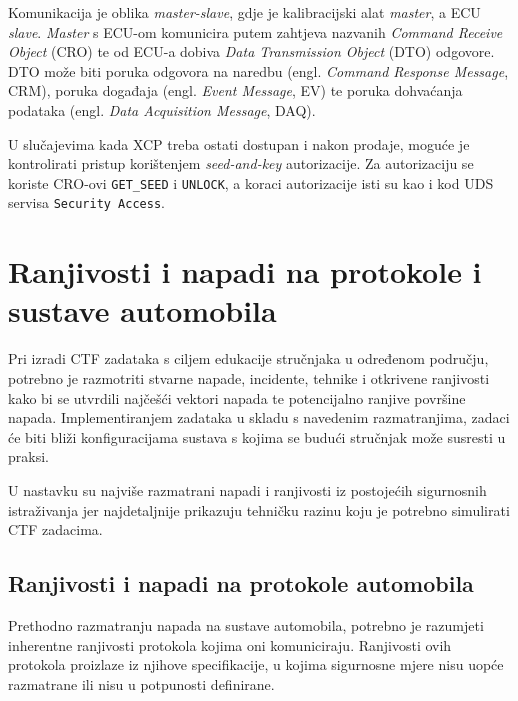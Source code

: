 \documentclass[times, utf8, diplomski, numeric]{fer}
\begin{document}
Komunikacija je oblika \textit{master-slave}, gdje je kalibracijski alat \textit{master}, a ECU \textit{slave}. \textit{Master} s ECU-om komunicira putem zahtjeva nazvanih \textit{Command Receive Object} (CRO) te od ECU-a dobiva \textit{Data Transmission Object} (DTO) odgovore. DTO može biti poruka odgovora na naredbu (engl. \textit{Command Response Message}, CRM), poruka događaja (engl. \textit{Event Message}, EV) te poruka dohvaćanja podataka (engl. \textit{Data Acquisition Message}, DAQ).

U slučajevima kada XCP treba ostati dostupan i nakon prodaje, moguće je kontrolirati pristup korištenjem \textit{seed-and-key} autorizacije. Za autorizaciju se koriste CRO-ovi \texttt{GET\_SEED} i \texttt{UNLOCK}, a koraci autorizacije isti su kao i kod UDS servisa \texttt{Security Access}.
\chapter{Ranjivosti i napadi na protokole i sustave automobila}

Pri izradi CTF zadataka s ciljem edukacije stručnjaka u određenom području, potrebno je razmotriti stvarne napade, incidente, tehnike i otkrivene ranjivosti kako bi se utvrdili najčešći vektori napada te potencijalno ranjive površine napada. Implementiranjem zadataka u skladu s navedenim razmatranjima, zadaci će biti bliži konfiguracijama sustava s kojima se budući stručnjak može susresti u praksi.

U nastavku su najviše razmatrani napadi i ranjivosti iz postojećih sigurnosnih istraživanja jer najdetaljnije prikazuju tehničku razinu koju je potrebno simulirati CTF zadacima.

\section{Ranjivosti i napadi na protokole automobila}
Prethodno razmatranju napada na sustave automobila, potrebno je razumjeti inherentne ranjivosti protokola kojima oni komuniciraju. Ranjivosti ovih protokola proizlaze iz njihove specifikacije, u kojima sigurnosne mjere nisu uopće razmatrane ili nisu u potpunosti definirane.
\end{document}

